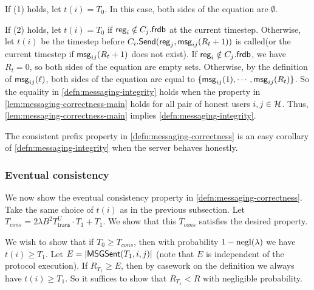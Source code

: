  If (1) holds, let $t(i) = T_0$. In this case, both sides of the equation are $\emptyset$.
 
 If (2) holds, let $t(i) = T_0$ if $\mathsf{reg}_i \notin C_j.\mathsf{frdb}$ at the current timestep. Otherwise, let $t(i)$ be the timestep before $C_i.\mathsf{Send}(\mathsf{reg}_j, \mathsf{msg}_{ij}(R_{t} + 1))$ is called(or the current timestep if $\mathsf{msg}_{ij}(R_{t} + 1)$ does not exist). If $\mathsf{reg}_i \notin C_j.\mathsf{frdb}$, we have $R_t = 0$, so both sides of the equation are empty sets. Otherwise, by the definition of $\mathsf{msg}_{ij}(\ell)$, both sides of the equation are equal to $\{\mathsf{msg}_{ij}(1),\cdots, \mathsf{msg}_{ij}(R_t)\}$. So the equality in \cref{defn:messaging-integrity} holds when the property in \cref{lem:messaging-correctness-main} holds for all pair of honest users $i, j \in \mathcal{H}$. Thus, \cref{lem:messaging-correctness-main} implies \cref{defn:messaging-integrity}.

The consistent prefix property in \cref{defn:messaging-correctness} is an easy corollary of \cref{defn:messaging-integrity} when the server behaves honestly.
 
 \subsubsection{Eventual consistency} We now show the eventual consistency property in \cref{defn:messaging-correctness}. Take the same choice of $t(i)$ as in the previous subsection. Let $T_{cons} = 2\lambda B^2 T^U_{\mathsf{trans}} \cdot T_1 + T_1.$ We show that this $T_{cons}$ satisfies the desired property. 
 
 We wish to show that if $T_0 \geq T_{cons}$, then with probability $1 - \operatorname{negl}(\lambda)$ we have $t(i) \geq T_1$. Let $E = \left| \mathsf{MSGSent}(T_1, i, j) \right|$ (note that $E$ is independent of the protocol execution). If $R_{T_1} \geq E$, then by casework on the definition we always have $t(i) \geq T_1$. So it suffices to show that $R_{T_1} < R$ with negligible probability. 
 
